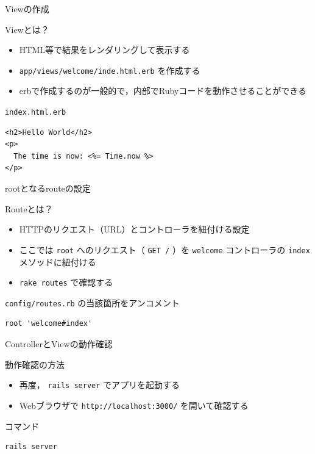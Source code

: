 \documentclass[t, aspectratio=169]{beamer}
\begin{document}
\begin{frame}[fragile,label=sec-6-2-2]{Viewの作成}
 \begin{block}{Viewとは？}
\begin{itemize}
\item HTML等で結果をレンダリングして表示する
\item \texttt{app/views/welcome/inde.html.erb} を作成する
\item erbで作成するのが一般的で，内部でRubyコードを動作させることができる
\end{itemize}
\end{block}

\begin{block}{\texttt{index.html.erb}}
\begin{verbatim}
<h2>Hello World</h2>
<p>
  The time is now: <%= Time.now %>
</p>
\end{verbatim}
\end{block}
\end{frame}
\begin{frame}[fragile,label=sec-6-2-3]{rootとなるrouteの設定}
 \begin{block}{Routeとは？}
\begin{itemize}
\item HTTPのリクエスト（URL）とコントローラを紐付ける設定
\item ここでは \texttt{root} へのリクエスト（ \texttt{GET /} ）を \texttt{welcome} コントローラの \texttt{index} メソッドに紐付ける
\item \texttt{rake routes} で確認する
\end{itemize}
\end{block}

\begin{block}{\texttt{config/routes.rb} の当該箇所をアンコメント}
\begin{verbatim}
root 'welcome#index'
\end{verbatim}
\end{block}
\end{frame}
\begin{frame}[fragile,label=sec-6-2-4]{ControllerとViewの動作確認}
 \begin{block}{動作確認の方法}
\begin{itemize}
\item 再度， \texttt{rails server} でアプリを起動する
\item Webブラウザで \texttt{http://localhost:3000/} を開いて確認する
\end{itemize}
\end{block}

\begin{block}{コマンド}
\begin{verbatim}
rails server
\end{verbatim}
\end{block}
\end{frame}
\end{document}
